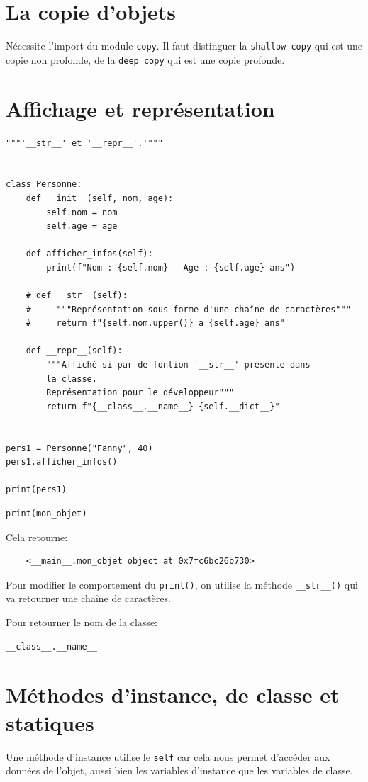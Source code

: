 \documentclass[a4paper,12pt]{book}
\begin{document}
\section{La copie d'objets}
Nécessite l'import du module \texttt{copy}. Il faut distinguer la \texttt{shallow copy} qui est une copie non profonde, de la \texttt{deep copy} qui est une copie profonde.
\medskip

\section{Affichage et représentation}
\begin{lstlisting}
"""'__str__' et '__repr__'.'"""


class Personne:
    def __init__(self, nom, age):
        self.nom = nom
        self.age = age

    def afficher_infos(self):
        print(f"Nom : {self.nom} - Age : {self.age} ans")

    # def __str__(self):
    #     """Représentation sous forme d'une chaîne de caractères"""
    #     return f"{self.nom.upper()} a {self.age} ans"

    def __repr__(self):
        """Affiché si par de fontion '__str__' présente dans 
        la classe.
        Représentation pour le développeur"""
        return f"{__class__.__name__} {self.__dict__}"


pers1 = Personne("Fanny", 40)
pers1.afficher_infos()

print(pers1)
\end{lstlisting}
\medskip

\begin{lstlisting}
print(mon_objet)
\end{lstlisting}
\medskip

Cela retourne:
\begin{verbatim}
    <__main__.mon_objet object at 0x7fc6bc26b730>
\end{verbatim}
\medskip

Pour modifier le comportement du \texttt{print()}, on utilise la méthode \texttt{\_\_str\_\_()} qui va retourner une chaîne de caractères.
\medskip

Pour retourner le nom de la classe:
\begin{lstlisting}
__class__.__name__
\end{lstlisting}
\medskip

\section{Méthodes d'instance, de classe et statiques}
Une méthode d'instance utilise le \texttt{self} car cela nous permet d'accéder aux données de l'objet, aussi bien les variables d'instance que les variables de classe.
\medskip
\end{document}
